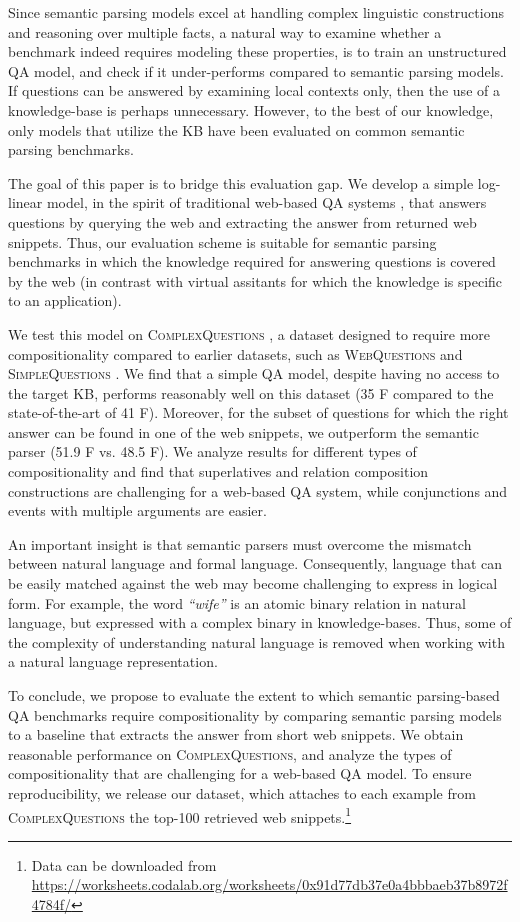 \documentclass[11pt,a4paper]{article}
\newcommand\nl[1]{{\it``#1''}}
\begin{document}
Since semantic parsing models excel at handling complex linguistic constructions and reasoning over multiple facts, a natural way to examine whether a benchmark indeed requires modeling these properties, is to train an unstructured QA model, and check if it under-performs compared to semantic parsing models.
If questions can be answered by examining local contexts only, then the use of a knowledge-base is perhaps unnecessary. However, to the best of our knowledge, only models that utilize the KB have been evaluated on common semantic parsing benchmarks. 

The goal of this paper is to bridge this evaluation gap. We develop a simple log-linear model, in the spirit of traditional web-based QA systems \cite{kwok2001scaling,brill2002askmsr}, that answers questions by querying the web and extracting the answer from returned web snippets. Thus, our evaluation scheme is suitable for semantic parsing benchmarks in which the knowledge required for answering questions is covered by the web (in contrast with virtual assitants for which the knowledge is specific to an application).

We test this model on \textsc{ComplexQuestions} \cite{bao2016constraint}, a dataset designed to
require more compositionality 
compared to earlier datasets, such as \textsc{WebQuestions} \cite{berant2013freebase} and \textsc{SimpleQuestions} \cite{bordes2015simple}. 
We find that a simple QA model, despite having no access to the target KB, performs reasonably well on this dataset (35 F compared to the state-of-the-art of 41 F).
Moreover, for the subset of questions for which the right answer can be found in one of the web snippets, we outperform the semantic parser (51.9 F vs. 48.5 F).
We analyze results for different types of compositionality and find that superlatives and relation composition constructions are challenging for a web-based QA system, while conjunctions and events with multiple arguments are easier.

An important insight is that semantic parsers must overcome the mismatch between natural language and formal language. Consequently, language that can be easily matched against the web may become challenging to express in logical form. For example, the word \nl{wife} is an atomic binary relation in natural language, but expressed with a complex binary  in knowledge-bases. Thus, some of the complexity of understanding natural language is removed when working with a natural language representation.

To conclude, we propose to evaluate the extent to which semantic parsing-based QA benchmarks require compositionality by comparing semantic parsing models to a baseline that extracts the answer from short web snippets. We  obtain reasonable performance on \textsc{ComplexQuestions}, and analyze the types of compositionality that are challenging for a web-based QA model. To ensure reproducibility, we release our dataset, which attaches to each example  from \textsc{ComplexQuestions} the top-100 retrieved web snippets.\footnote{Data can be downloaded from \url{https://worksheets.codalab.org/worksheets/0x91d77db37e0a4bbbaeb37b8972f4784f/}}
\end{document}
